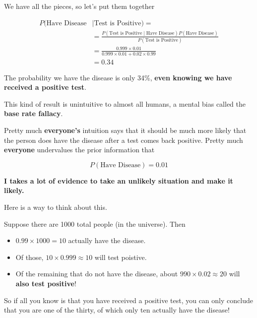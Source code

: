 \begin{frame}

We have all the pieces, so let's put them together

\begin{align*}
P(\text{Have Disease}  & \mid \text{Test is Positive}) = \\
%
&= \frac{  P(\text{Test is
Positive} \mid \text{Have Disease}) P(\text{Have Disease}) } { P(\text{Test is
Positive}) } \\
%
&= \frac{ 0.999 \times 0.01 } {  0.999 \times 0.01 +  0.02 \times 0.99 } \\
%
&= 0.34
\end{align*}

The probability we have the disease is only 34\%, \textbf{even knowing we
have received a positive test}.

\end{frame}
%

%
\begin{frame}

This kind of result is unintuitive to almost all humans, a mental bias called the
\textbf{base rate fallacy}.

\end{frame}
%

%
\begin{frame}

Pretty much \textbf{everyone's} intuition says that it should be much more
likely that the person does have the disease after a test comes back positive.
Pretty much \textbf{everyone} undervalues the prior information that

$$ P(\text{Have Disease}) = 0.01 $$

\textbf{I takes a lot of evidence to take an unlikely situation and make it
likely.}

\end{frame}
%

%
\begin{frame}

Here is a way to think about this.

Suppose there are 1000 total people (in the universe).  Then

\begin{itemize}
  \item $0.99 \times 1000 = 10$ actually have the disease.
  \item Of those, $10 \times 0.999 \approx 10$ will test poistive.
  \item Of the remaining that do not have the disease, about $990 \times 0.02 \approx 20$ will \textbf{also test positive}!
\end{itemize}

So if all you know is that you have received a positive test, you can only conclude that you are one of the thirty, of which only ten actually have the disease!

\end{frame}
%

